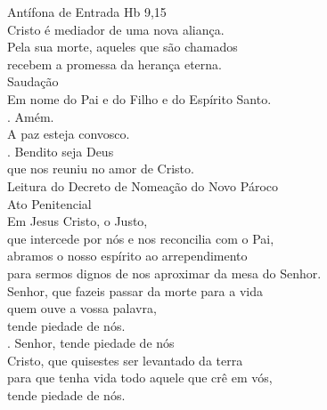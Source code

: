 \documentclass{book}
\begin{document}
\begin{flushleft}
    \textcolor{VioletRed2}{Antífona de Entrada}
    \hspace{\fill}
    \textcolor{VioletRed2}{Hb 9,15}
    \vspace{.2cm} \\
    Cristo é mediador de uma nova aliança. \\
    Pela sua morte, aqueles que são chamados \\
    recebem a promessa da herança eterna.
    \vspace{.2cm} \\
    \textcolor{VioletRed2}{Saudação}
    \vspace{.2cm}\\
    Em nome do Pai e do Filho e do Espírito Santo. \\
    {\color{VioletRed2} \Rbar.} Amém. \\
    A paz esteja convosco. \\
    {\color{VioletRed2} \Rbar.} Bendito seja Deus \\
    que nos reuniu no amor de Cristo.
    \vspace{.2cm} \\
    \textcolor{VioletRed2}{Leitura do Decreto de Nomeação do Novo Pároco}
    \vspace{.2cm} \\
    \textcolor{VioletRed2}{Ato Penitencial}
    \vspace{.2cm} \\
    Em Jesus Cristo, o Justo, \\
    que intercede por nós e nos reconcilia com o Pai, \\
    abramos o nosso espírito ao arrependimento \\
    para sermos dignos de nos aproximar da mesa do Senhor.
    \vspace{.2cm} \\
    Senhor, que fazeis passar da morte para a vida \\
    quem ouve a vossa palavra, \\
    tende piedade de nós. \\
    {\color{VioletRed2} \Rbar.} Senhor, tende piedade de nós
    \vspace{.2cm} \\
    Cristo, que quisestes ser levantado da terra \\
    para que tenha vida todo aquele que crê em vós, \\
    tende piedade de nós. \\

\end{flushleft}
\end{document}
